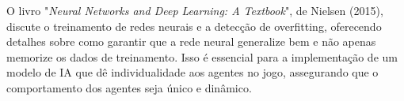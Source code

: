 O livro "\textit{Neural Networks and Deep Learning: A Textbook}", de Nielsen (2015), discute o treinamento de redes neurais e a detecção de overfitting, oferecendo detalhes sobre como garantir que a rede neural generalize bem e não apenas memorize os dados de treinamento. Isso é essencial para a implementação de um modelo de IA que dê individualidade aos agentes no jogo, assegurando que o comportamento dos agentes seja único e dinâmico.